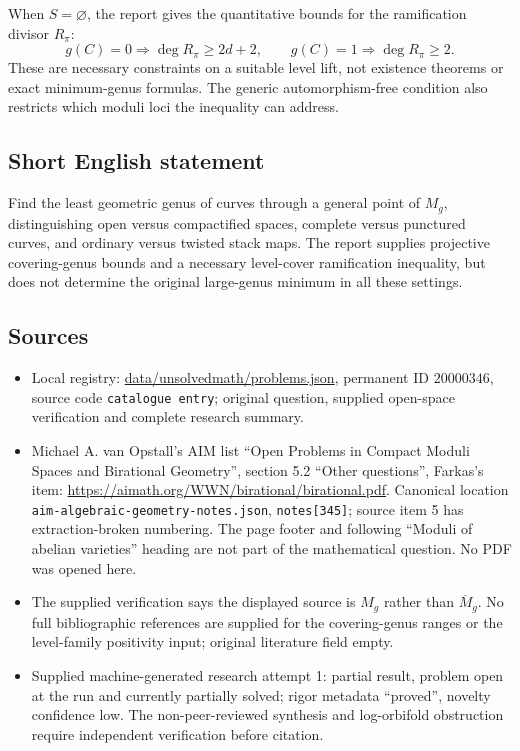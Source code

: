 \documentclass[11pt]{article}
\begin{document}
When $S=\varnothing$, the report gives the quantitative bounds for the ramification divisor $R_\pi$:
\[
 g(C)=0\Longrightarrow\deg R_\pi\geq2d+2,
 \qquad g(C)=1\Longrightarrow\deg R_\pi\geq2.
\]
These are necessary constraints on a suitable level lift, not existence theorems or exact minimum-genus formulas. The generic automorphism-free condition also restricts which moduli loci the inequality can address.
\subsection{Short English statement}
Find the least geometric genus of curves through a general point of $M_g$, distinguishing open versus compactified spaces, complete versus punctured curves, and ordinary versus twisted stack maps. The report supplies projective covering-genus bounds and a necessary level-cover ramification inequality, but does not determine the original large-genus minimum in all these settings.
\subsection{Sources}
\begin{itemize}
\item Local registry: \url{data/unsolvedmath/problems.json}, permanent ID $20000346$, source code \texttt{catalogue entry}; original question, supplied open-space verification and complete research summary.
\item Michael A. van Opstall's AIM list ``Open Problems in Compact Moduli Spaces and Birational Geometry'', section 5.2 ``Other questions'', Farkas's item: \url{https://aimath.org/WWN/birational/birational.pdf}. Canonical location \texttt{aim-algebraic-geometry-notes.json}, \texttt{notes[345]}; source item 5 has extraction-broken numbering. The page footer and following ``Moduli of abelian varieties'' heading are not part of the mathematical question. No PDF was opened here.
\item The supplied verification says the displayed source is $M_g$ rather than $\overline M_g$. No full bibliographic references are supplied for the covering-genus ranges or the level-family positivity input; original literature field empty.
\item Supplied machine-generated research attempt 1: partial result, problem open at the run and currently partially solved; rigor metadata ``proved'', novelty confidence low. The non-peer-reviewed synthesis and log-orbifold obstruction require independent verification before citation.
\end{itemize}
\end{document}
